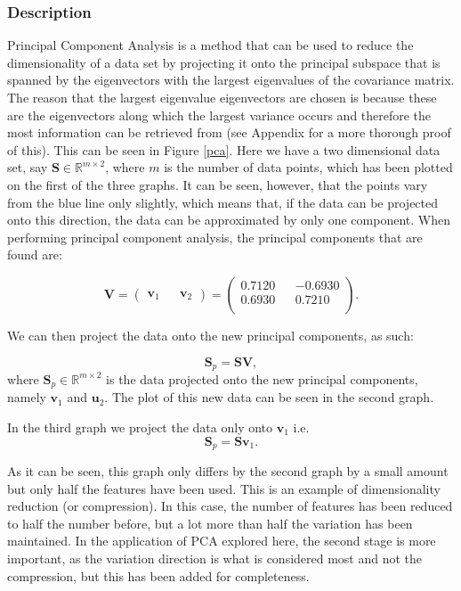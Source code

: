 \documentclass[11pt,a4paper]{article}
\begin{document}
\subsubsection{Description}
Principal Component Analysis is a method that can be used to reduce the dimensionality of a data set by projecting it onto the principal subspace that is spanned by the eigenvectors with the largest eigenvalues of the covariance matrix. The reason that the largest eigenvalue eigenvectors are chosen is because these are the eigenvectors along which the largest variance occurs and therefore the most information can be retrieved from (see Appendix for a more thorough proof of this). This can be seen in Figure \ref{pca}. Here we have a two dimensional data set, say $\mathbf{S} \in \mathbb{R}^{m \times 2}$, where $m$ is the number of data points, which has been plotted on the first of the three graphs. It can be seen, however, that the points vary from the blue line only slightly, which means that, if the data can be projected onto this direction, the data can be approximated by only one component. When performing principal component analysis, the principal components that are found are:

\begin{equation*}
\mathbf{V} = 
\begin{pmatrix}
\mathbf{v}_1 && \mathbf{v}_2
\end{pmatrix} = 
\begin{pmatrix}
0.7120 && -0.6930\\
 0.6930 && 0.7210\\
\end{pmatrix}.
\end{equation*}

We can then project the data onto the new principal components, as such:

\begin{equation*}
\mathbf{S}_p = \mathbf{S}\mathbf{V},
\end{equation*}
where $\mathbf{S}_p \in \mathbb{R}^{m \times 2}$ is the data projected onto the new principal components, namely $\mathbf{v}_1$ and $\mathbf{u}_2$. The plot of this new data can be seen in the second graph. 

In the third graph we project the data only onto $\mathbf{v}_1$ i.e.
\begin{equation*}
\mathbf{S}_p = \mathbf{S}\mathbf{v}_1.
\end{equation*}

As it can be seen, this graph only differs by the second graph by a small amount but only half the features have been used. This is an example of dimensionality reduction (or compression). In this case, the number of features has been reduced to half the number before, but a lot more than half the variation has been maintained. In the application of PCA explored here, the second stage is more important, as the variation direction is what is considered most and not the compression, but this has been added for completeness.
\end{document}
